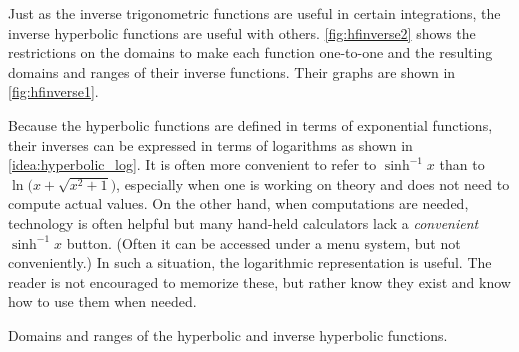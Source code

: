 Just as the inverse trigonometric functions are useful in certain integrations, the inverse hyperbolic functions are useful with others. \autoref{fig:hfinverse2} shows the restrictions on the domains to make each function one-to-one and the resulting domains and ranges of their inverse functions. Their graphs are shown in \autoref{fig:hfinverse1}.

Because the hyperbolic functions are defined in terms of exponential functions, their inverses can be expressed in terms of logarithms as shown in \autoref{idea:hyperbolic_log}. It is often more convenient to refer to $\sinh^{-1}x$ than to $\ln\big(x+\sqrt{x^2+1}\big)$, especially when one is working on theory and does not need to compute actual values. On the other hand, when computations are needed, technology is often helpful but many hand-held calculators lack a \textit{convenient} $\sinh^{-1}x$ button. (Often it can be accessed under a menu system, but not conveniently.) In such a situation, the logarithmic representation is useful. The reader is not encouraged to memorize these, but rather know they exist and know how to use them when needed.

\noindent\begin{minipage}[t]{\linewidth}\noindent%
\captionsetup{type=figure}%
\flushinner{%
\small
\begin{tabular}{lcc @{\hspace{2em}} ccc}
Function & Domain & Range & Function & Domain & Range \\ \cmidrule(r{2em}){1-3} \cmidrule(l{-1em}){4-6}
$\cosh x$ & $[0,\infty)$ & $[1,\infty)$ &
 $\cosh^{-1} x$ & $[1,\infty)$ & $[0,\infty)$ \\
$\sinh x$ & $(-\infty,\infty)$ & $(-\infty,\infty)$ &
 $\sinh^{-1} x$ & $(-\infty,\infty)$ & $(-\infty,\infty)$\\
$\tanh x$ & $(-\infty,\infty)$ & $(-1,1)$ &
 $\tanh^{-1} x$ & $(-1,1)$ & $(-\infty,\infty)$\\
$\sech x$ & $[0,\infty)$ & $(0,1]$ & $\sech^{-1} x$ & $(0,1]$ & $[0,\infty)$\\
$\csch x$ & $(-\infty,0) \cup (0,\infty)$ & $(-\infty,0) \cup (0,\infty)$ &
 $\csch^{-1} x$ & $(-\infty,0) \cup (0,\infty)$ & $(-\infty,0) \cup (0,\infty)$\\
$\coth x$ & $(-\infty,0) \cup (0,\infty)$ & $(-\infty,-1) \cup (1,\infty)$ &
 $\coth^{-1} x$ & $(-\infty,-1) \cup (1,\infty)$ & $(-\infty,0) \cup (0,\infty)$
\end{tabular}}
\caption{Domains and ranges of the hyperbolic and inverse hyperbolic functions.}
\label{fig:hfinverse2}
\end{minipage}

